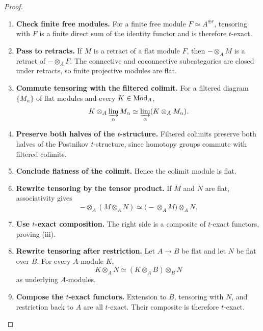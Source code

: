 \begin{proof}
\leavevmode
\begin{enumerate}[label=\textup{(\arabic*)}]
    \item \textbf{Check finite free modules.}
    For a finite free module \(F\simeq A^{\oplus r}\), tensoring with \(F\)
    is a finite direct sum of the identity functor and is therefore
    \(t\)-exact.

    \item \textbf{Pass to retracts.}
    If \(M\) is a retract of a flat module \(F\), then
    \(-\otimes_AM\) is a retract of \(-\otimes_AF\). The connective and
    coconnective subcategories are closed under retracts, so finite projective
    modules are flat.

    \item \textbf{Commute tensoring with the filtered colimit.}
    For a filtered diagram \(\{M_\alpha\}\) of flat modules and every
    \(K\in\operatorname{Mod}_A\),
    \[
        K\otimes_A\varinjlim_\alpha M_\alpha
        \simeq
        \varinjlim_\alpha(K\otimes_AM_\alpha).
    \]

    \item \textbf{Preserve both halves of the $t$-structure.}
    Filtered colimits preserve both halves of the Postnikov \(t\)-structure,
    since homotopy groups commute with filtered colimits.

    \item \textbf{Conclude flatness of the colimit.}
    Hence the colimit
    module is flat.

    \item \textbf{Rewrite tensoring by the tensor product.}
    If \(M\) and \(N\) are flat, associativity gives
    \[
        -\otimes_A(M\otimes_AN)
        \simeq
        \bigl(-\otimes_AM\bigr)\otimes_AN.
    \]

    \item \textbf{Use $t$-exact composition.}
    The right side is a composite of \(t\)-exact functors, proving
    \textup{(iii)}.

    \item \textbf{Rewrite tensoring after restriction.}
    Let \(A\to B\) be flat and let \(N\) be flat over \(B\). For every
    \(A\)-module \(K\),
    \[
        K\otimes_AN
        \simeq
        (K\otimes_AB)\otimes_BN
    \]
    as underlying \(A\)-modules.

    \item \textbf{Compose the $t$-exact functors.}
    Extension to \(B\), tensoring with \(N\),
    and restriction back to \(A\) are all \(t\)-exact. Their composite is
    therefore \(t\)-exact.


\end{enumerate}
\end{proof}
